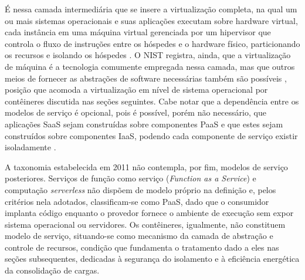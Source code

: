 É nessa camada intermediária que se insere a virtualização completa, na qual um ou mais sistemas operacionais e suas aplicações executam sobre hardware virtual, cada instância em uma máquina virtual gerenciada por um hipervisor que controla o fluxo de instruções entre os hóspedes e o hardware físico, particionando os recursos e isolando os hóspedes \cite{scarfone2011guide}. O NIST registra, ainda, que a virtualização de máquina é a tecnologia comumente empregada nessa camada, mas que outros meios de fornecer as abstrações de software necessárias também são possíveis \cite{liu2011nist}, posição que acomoda a virtualização em nível de sistema operacional por contêineres discutida nas seções seguintes. Cabe notar que a dependência entre os modelos de serviço é opcional, pois é possível, porém não necessário, que aplicações SaaS sejam construídas sobre componentes PaaS e que estes sejam construídos sobre componentes IaaS, podendo cada componente de serviço existir isoladamente \cite{liu2011nist}.

A taxonomia estabelecida em 2011 não contempla, por fim, modelos de serviço posteriores. Serviços de função como serviço (\emph{Function as a Service}) e computação \emph{serverless} não dispõem de modelo próprio na definição e, pelos critérios nela adotados, classificam-se como PaaS, dado que o consumidor implanta código enquanto o provedor fornece o ambiente de execução sem expor sistema operacional ou servidores. Os contêineres, igualmente, não constituem modelo de serviço, situando-se como mecanismo da camada de abstração e controle de recursos, condição que fundamenta o tratamento dado a eles nas seções subsequentes, dedicadas à segurança do isolamento e à eficiência energética da consolidação de cargas.

%
%
%
